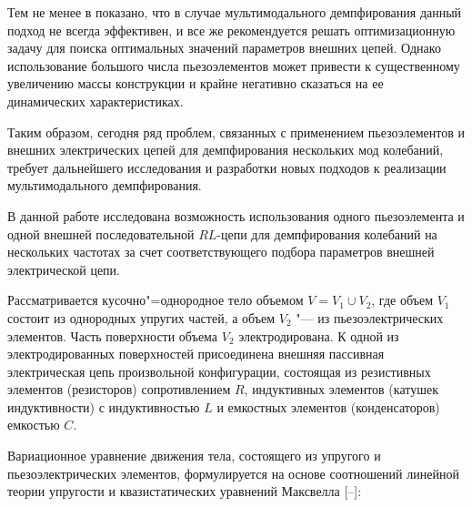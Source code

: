Тем не менее в \cite{mult:Ref18} показано, что в случае мультимодального демпфирования данный подход не всегда эффективен, и все же рекомендуется решать оптимизационную задачу для поиска оптимальных значений параметров внешних цепей. Однако использование большого числа пьезоэлементов может привести к существенному увеличению массы конструкции и крайне негативно сказаться на ее динамических характеристиках.

Таким образом, сегодня ряд проблем, связанных с применением пьезоэлементов и внешних электрических цепей для демпфирования нескольких мод колебаний, требует дальнейшего исследования и разработки новых подходов к реализации мультимодального демпфирования.

В данной работе исследована возможность использования одного пьезоэлемента и одной внешней последовательной $RL$-цепи для демпфирования колебаний на нескольких частотах за счет соответствующего подбора параметров внешней электрической цепи.



\smallskip




Рассматривается кусочно"=однородное тело объемом $V=V_{1}\cup V_{2}$, где объем $V_{1}$ состоит из однородных упругих частей, а объем $V_{2}$ "---  из пьезоэлектрических элементов. Часть поверхности объема $V_{2}$ электродирована. К одной из электродированных поверхностей присоединена внешняя пассивная электрическая цепь произвольной конфигурации, состоящая из резистивных элементов (резисторов) сопротивлением $R$, индуктивных элементов (катушек индуктивности) с индуктивностью $L$ и емкостных элементов (конденсаторов) емкостью $C$.



Вариационное уравнение движения тела, состоящего из упругого и пьезоэлектрических элементов, формулируется на основе соотношений линейной теории упругости и квазистатических уравнений Максвелла [--]:



